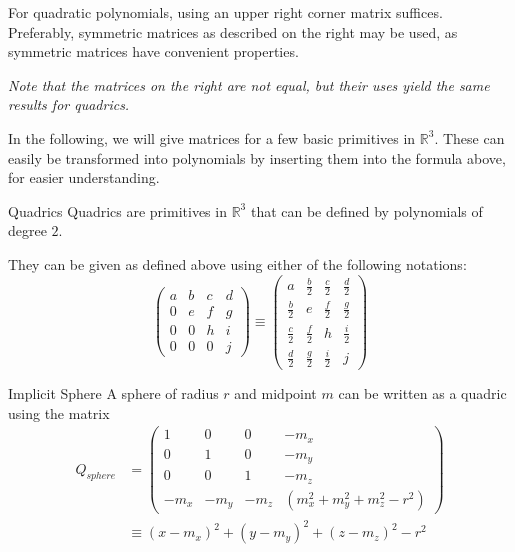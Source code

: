 \documentclass[english]{panikzettel}
\begin{document}
\begin{halfboxl}
For quadratic polynomials, using an upper right corner matrix suffices. Preferably, symmetric matrices as described on the right may be used, as symmetric matrices have convenient properties.

\emph{Note that the matrices on the right are not equal, but their uses yield the same results for quadrics.}

In the following, we will give matrices for a few basic primitives in $\mathbb{R}^3$. These can easily be transformed into polynomials by inserting them into the formula above, for easier understanding.
\end{halfboxl}%
\begin{halfboxr}
\vspace{-\baselineskip}
\begin{defi}{Quadrics}
Quadrics are primitives in $\mathbb{R}^3$ that can be defined by polynomials of degree $2$.

They can be given as defined above using either of the following notations:
$$\begin{pmatrix}
a & b & c & d \\
0 & e & f & g \\
0 & 0 & h & i \\
0 & 0 & 0 & j
\end{pmatrix} \equiv
\begin{pmatrix}
a & \frac{b}{2} & \frac{c}{2} & \frac{d}{2} \\
\frac{b}{2} & e & \frac{f}{2} & \frac{g}{2} \\
\frac{c}{2} & \frac{f}{2} & h & \frac{i}{2} \\
\frac{d}{2} & \frac{g}{2} & \frac{i}{2} & j
\end{pmatrix}$$
\end{defi}
\end{halfboxr}

\begin{defi}{Implicit Sphere}
A sphere of radius $r$ and midpoint $m$ can be written as a quadric using the matrix
\begin{align*}Q_{sphere} &=
\begin{pmatrix}
1 & 0 & 0 & -m_x \\
0 & 1 & 0 & -m_y \\
0 & 0 & 1 & -m_z \\
-m_x & -m_y & -m_z & (m_x^2 + m_y^2 + m_z^2 - r^2)
\end{pmatrix} \\
&\equiv (x-m_x)^2 + (y-m_y)^2 + (z-m_z)^2 -r^2
\end{align*}
\end{defi}
\end{document}
